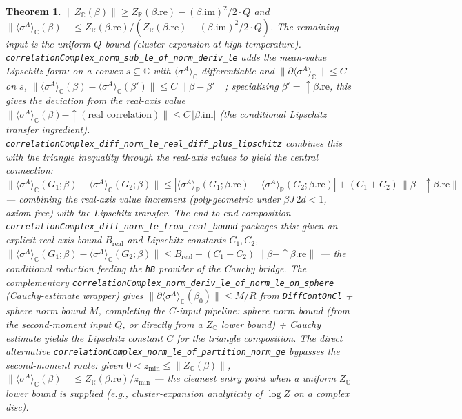 \documentclass[a4paper,11pt]{article}
\newtheorem{theorem}{Theorem}
\begin{document}
\begin{theorem}
\(\|Z_{\mathbb{C}}(\beta)\|\ge Z_{\mathbb{R}}(\beta.\mathrm{re})-(\beta.\mathrm{im})^2/2\cdot Q\)
and \(\|\langle\sigma^A\rangle_{\mathbb{C}}(\beta)\|\le Z_{\mathbb{R}}(\beta.\mathrm{re})/
(Z_{\mathbb{R}}(\beta.\mathrm{re})-(\beta.\mathrm{im})^2/2\cdot Q)\).  The remaining input
is the uniform \(Q\) bound (cluster expansion at high temperature).
\texttt{correlationComplex\_norm\_sub\_le\_of\_norm\_deriv\_le} adds the mean-value
Lipschitz form: on a convex \(s\subseteq\mathbb{C}\) with \(\langle\sigma^A\rangle_{\mathbb{C}}\)
differentiable and \(\|\partial\langle\sigma^A\rangle_{\mathbb{C}}\|\le C\) on \(s\),
\(\|\langle\sigma^A\rangle_{\mathbb{C}}(\beta)-\langle\sigma^A\rangle_{\mathbb{C}}(\beta')\|
\le C\,\|\beta-\beta'\|\); specialising \(\beta'=\uparrow\!\beta.\mathrm{re}\), this gives
the deviation from the real-axis value
\(\|\langle\sigma^A\rangle_{\mathbb{C}}(\beta)-\uparrow\!(\text{real correlation})\|
\le C\,|\beta.\mathrm{im}|\) (the conditional Lipschitz transfer ingredient).
\texttt{correlationComplex\_diff\_norm\_le\_real\_diff\_plus\_lipschitz} combines this with
the triangle inequality through the real-axis values to yield the central connection:
\(\|\langle\sigma^A\rangle_{\mathbb{C}}(G_1;\beta)-\langle\sigma^A\rangle_{\mathbb{C}}(G_2;\beta)\|
\le|\langle\sigma^A\rangle_{\mathbb{R}}(G_1;\beta.\mathrm{re})-\langle\sigma^A\rangle_{\mathbb{R}}(G_2;\beta.\mathrm{re})|
+(C_1+C_2)\,\|\beta-\uparrow\!\beta.\mathrm{re}\|\) ---
combining the real-axis value increment (poly\(\cdot\)geometric under \(\beta J\,2d<1\),
axiom-free) with the Lipschitz transfer.  The end-to-end composition
\texttt{correlationComplex\_diff\_norm\_le\_from\_real\_bound} packages this: given an
explicit real-axis bound \(B_{\text{real}}\) and Lipschitz constants \(C_1,C_2\),
\(\|\langle\sigma^A\rangle_{\mathbb{C}}(G_1;\beta)-\langle\sigma^A\rangle_{\mathbb{C}}(G_2;\beta)\|
\le B_{\text{real}}+(C_1+C_2)\,\|\beta-\uparrow\!\beta.\mathrm{re}\|\) ---
the conditional reduction feeding the \texttt{hB} provider of the Cauchy bridge.
The complementary \texttt{correlationComplex\_norm\_deriv\_le\_of\_norm\_le\_on\_sphere}
(Cauchy-estimate wrapper) gives
\(\|\partial\langle\sigma^A\rangle_{\mathbb{C}}(\beta_0)\|\le M/R\) from
\texttt{DiffContOnCl} + sphere norm bound \(M\), completing the \(C\)-input pipeline:
sphere norm bound (from the second-moment input \(Q\), or directly from a
\(Z_{\mathbb{C}}\) lower bound) + Cauchy estimate yields the Lipschitz constant \(C\) for
the triangle composition.  The direct alternative
\texttt{correlationComplex\_norm\_le\_of\_partition\_norm\_ge} bypasses the second-moment
route: given \(0<z_{\min}\le\|Z_{\mathbb{C}}(\beta)\|\),
\(\|\langle\sigma^A\rangle_{\mathbb{C}}(\beta)\|\le Z_{\mathbb{R}}(\beta.\mathrm{re})/z_{\min}\)
--- the cleanest entry point when a uniform \(Z_{\mathbb{C}}\) lower bound is supplied
(e.g., cluster-expansion analyticity of \(\log Z\) on a complex disc).
\end{theorem}
\end{document}
